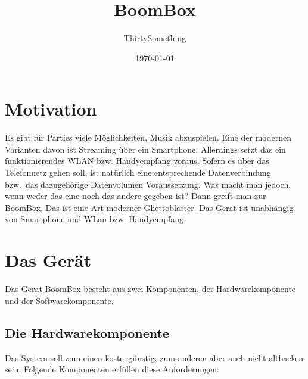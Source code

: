 \documentclass[12pt,a4paper]{article}
\author{ThirtySomething}
\title{BoomBox}
\date{\today}
\newcommand{\bb}{\href{https://github.com/ThirtySomething/BoomBox}{BoomBox}}
\begin{document}
\clearpage\maketitle
\thispagestyle{empty}
\newpage

\tableofcontents
{}
\newpage

\section{Motivation}
Es gibt für Parties viele Möglichkeiten, Musik abzuspielen. Eine der modernen Varianten davon ist Streaming über ein Smartphone. Allerdings setzt das
ein funktionierendes WLAN bzw. Handyempfang voraus. Sofern es über das Telefonnetz gehen soll, ist natürlich eine entsprechende Datenverbindung bzw.~das
dazugehörige Datenvolumen Voraussetzung. Was macht man jedoch, wenn weder das eine noch das andere gegeben ist? Dann greift man zur \bb{}.
Das ist eine Art moderner Ghettoblaster. Das Gerät ist unabhängig von Smartphone und WLan bzw. Handyempfang.

\section{Das Gerät}
Das Gerät \bb{} besteht aus zwei Komponenten, der Hardwarekomponente und der Softwarekomponente.

\subsection{Die Hardwarekomponente}
Das System soll zum einen kostengünstig, zum anderen aber auch nicht altbacken sein. Folgende Komponenten erfüllen diese Anforderungen:
\end{document}
